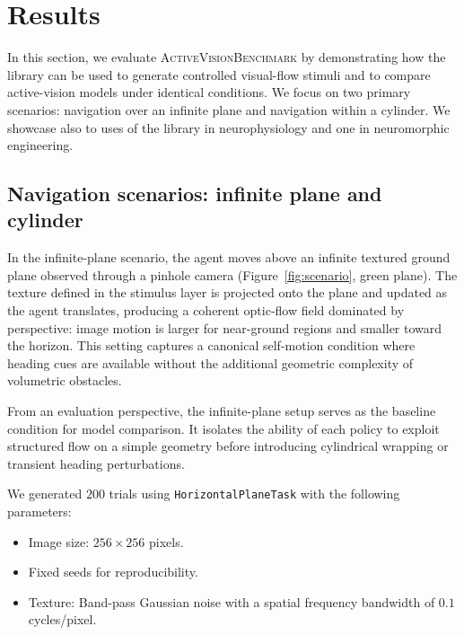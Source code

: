 \documentclass[12pt,a4paper]{article}
\newcommand{\avb}{\textsc{ActiveVisionBenchmark}}  %
\begin{document}
\section{Results}
\label{sec:results}

In this section, we evaluate \avb{} by demonstrating how the library can be used to generate controlled visual-flow stimuli and to compare active-vision models under identical conditions. We focus on two primary scenarios: navigation over an infinite plane and navigation within a cylinder. We showcase also to uses of the library in neurophysiology and one in neuromorphic engineering. 

\subsection{Navigation scenarios: infinite plane and cylinder}
\label{subsec:navigation}

In the infinite-plane scenario, the agent moves above an infinite textured ground plane observed through a pinhole camera (Figure~\ref{fig:scenario}, green plane). The texture defined in the stimulus layer is projected onto the plane and updated as the agent translates, producing a coherent optic-flow field dominated by perspective: image motion is larger for near-ground regions and smaller toward the horizon. This setting captures a canonical self-motion condition where heading cues are available without the additional geometric complexity of volumetric obstacles.

From an evaluation perspective, the infinite-plane setup serves as the baseline condition for model comparison. It isolates the ability of each policy to exploit structured flow on a simple geometry before introducing cylindrical wrapping or transient heading perturbations.

We generated $200$ trials using \texttt{HorizontalPlaneTask} with the following parameters:
\begin{itemize}
    \item Image size: $256 \times 256$ pixels.
    \item Fixed seeds for reproducibility.
    \item Texture: Band-pass Gaussian noise with a spatial frequency bandwidth of $0.1$ cycles/pixel.
\end{itemize}
\end{document}

